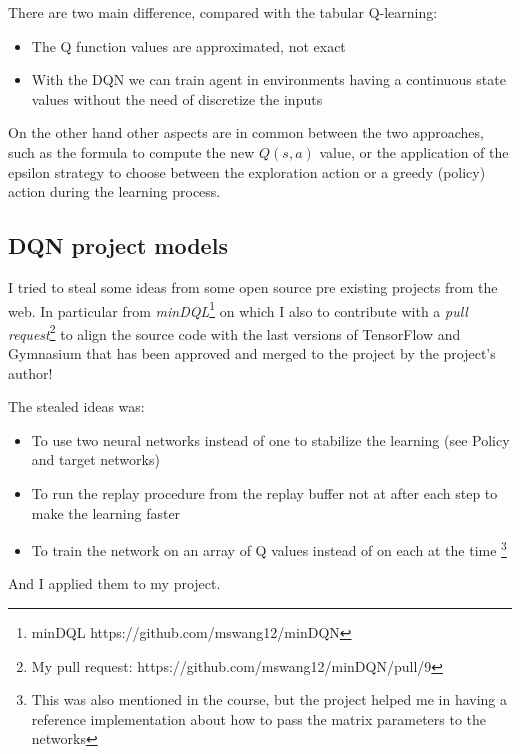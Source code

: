 \documentclass{article}
\begin{document}
There are two main difference, compared with the tabular Q-learning:

\begin{itemize}
  \item{The Q function values are approximated, not exact}
  \item{With the DQN we can train agent in environments having a continuous state values}
  without the need of discretize the inputs
\end{itemize}

On the other hand other aspects are in common between the two approaches, such as
the formula to compute the new $Q(s,a)$ value, or the application of the epsilon strategy
to choose between the exploration action or a greedy (policy) action during the learning process.

\subsection{DQN project models}

I tried to steal some ideas from some open source pre existing projects from the web.
In particular from \emph{minDQL}\footnote{minDQL https://github.com/mswang12/minDQN} on which I also to contribute with 
a \emph{pull request}\footnote{My pull request: https://github.com/mswang12/minDQN/pull/9} 
to align the source code with the last versions of TensorFlow and Gymnasium 
that has been approved and merged to the project by the project's author!

The stealed ideas was:

\begin{itemize}
  \item{To use two neural networks instead of one to stabilize the learning (see Policy and target networks)}
  \item{To run the replay procedure from the replay buffer not at after each step to make the learning faster}
  \item{To train the network on an array of Q values instead of on each at the time
  \footnote{This was also mentioned in the course, but the project helped me in having a 
  reference implementation about how to pass the matrix parameters to the networks}}
\end{itemize}

And I applied them to my project.
\end{document}

